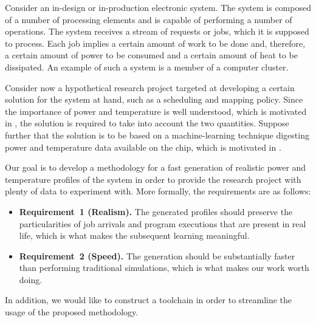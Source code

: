 Consider an in-design or in-production electronic system. The system is composed
of a number of processing elements and is capable of performing a number of
operations. The system receives a stream of requests or jobs, which it is
supposed to process. Each job implies a certain amount of work to be done and,
therefore, a certain amount of power to be consumed and a certain amount of heat
to be dissipated. An example of such a system is a member of a computer cluster.

Consider now a hypothetical research project targeted at developing a certain
solution for the system at hand, such as a scheduling and mapping policy. Since
the importance of power and temperature is well understood, which is motivated
in , the solution is required to take into account the two
quantities. Suppose further that the solution is to be based on a
machine-learning technique digesting power and temperature data available on the
chip, which is motivated in .

Our goal is to develop a methodology for a fast generation of realistic power
and temperature profiles of the system in order to provide the research project
with plenty of data to experiment with. More formally, the requirements are as
follows:

\begin{itemize}
  \item {\bfseries Requirement~1 (Realism).} The generated profiles should
  preserve the particularities of job arrivals and program executions that are
  present in real life, which is what makes the subsequent learning meaningful.

  \item {\bfseries Requirement~2 (Speed).} The generation should be
  substantially faster than performing traditional simulations, which is what
  makes our work worth doing.
\end{itemize}

In addition, we would like to construct a toolchain in order to streamline the
usage of the proposed methodology.

